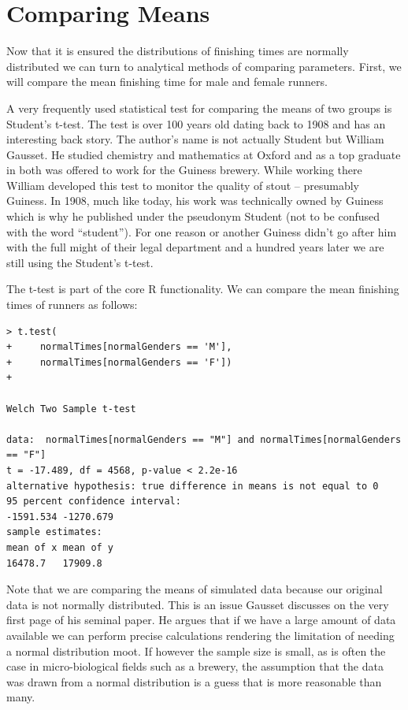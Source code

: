 \documentclass{tufte-book} %
\begin{document}
\section{Comparing Means}
Now that it is ensured the distributions of finishing times are normally distributed we can turn to analytical methods of comparing parameters. First, we will compare the mean finishing time for male and female runners. 

A very frequently used statistical test for comparing the means of two groups is Student's \hbox{t-test}\cite{student1908}. The test is over 100 years old dating back to 1908 and has an interesting back story. The author's name is not actually Student but William Gausset. He studied chemistry and mathematics at Oxford and as a top graduate in both was offered to work for the Guiness brewery. While working there William developed this test to monitor the quality of stout -- presumably Guiness. In 1908, much like today, his work was technically owned by Guiness which is why he published under the pseudonym Student (not to be confused with the word ``student''). For one reason or another Guiness didn't go after him with the full might of their legal department and a hundred years later we are still using the Student's \hbox{t-test}.

The \hbox{t-test} is part of the core R functionality. We can compare the mean finishing times of runners as follows:

\begin{Verbatim}
> t.test(
+     normalTimes[normalGenders == 'M'], 
+     normalTimes[normalGenders == 'F'])
+ 

Welch Two Sample t-test

data:  normalTimes[normalGenders == "M"] and normalTimes[normalGenders == "F"]
t = -17.489, df = 4568, p-value < 2.2e-16
alternative hypothesis: true difference in means is not equal to 0
95 percent confidence interval:
-1591.534 -1270.679
sample estimates:
mean of x mean of y 
16478.7   17909.8 
\end{Verbatim}

Note that we are comparing the means of simulated data because our original data is not normally distributed. This is an issue Gausset discusses on the very first page of his seminal paper. He argues that if we have a large amount of data available we can perform precise calculations rendering the limitation of needing a normal distribution moot. If however the sample size is small, as is often the case in micro-biological fields such as a brewery, the assumption that the data was drawn from a normal distribution is a guess that is more reasonable than many. 
\end{document}

